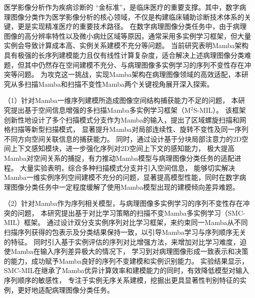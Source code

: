 \begin{cabstract}	%
医学影像分析作为疾病诊断的 “金标准”，是临床医疗的重要支撑。其中，数字病理图像分类作为医学影像分析的核心领域，不仅是构建临床辅助诊断技术体系的关键，更是实现精准医疗的重要技术路径。
在数字病理图像分类任务中，由于病理图像的高分辨率特性以及微小病灶区域等原因，通常采用多实例学习框架，但大量实例会导致计算成本高、实例关系建模不充分等问题。
当前研究表明Mamba架构具有极强的长序列建模能力且仅有线性计算复杂度，适合解决上述病理图像分类难题，但其中仍然存在空间建模不充分、与病理图像多实例学习的序列不变性存在冲突等问题。
为攻克这一挑战，实现Mamba架构在病理图像领域的高效适配，本研究从多扫描Mamba和扫描不变性Mamba两个关键视角展开深入探索。

（1）针对Mamba一维序列建模所造成图像空间结构捕获能力不足的问题，
本研究提出基于空间信息增强的多扫描Mamba多实例学习框架（M$^2$S-MIL）。
该框架创新性地设计了多个扫描模式分支作为Mamba的输入，提出了区域螺旋扫描和网格扫描等新型扫描模式，
显著提升Mamba对局部连续性、旋转不变性及同一序列不同方向空间关联信息的捕获能力。
同时，通过设计基于分块局部注意力的2D空间上下文感知模块，进一步强化序列对2D空间上下文的感知能力，
极大提高Mamba对空间关系的捕捉，有力推动Mamba模型与病理图像分类任务的适配进程。
大量实验表明，综合多种扫描模式分支并引入空间信息，
能够切实解决Mamba一维实例序列空间建模不充分的问题，显著提高模型性能，同时在数字病理图像分类任务中一定程度缓解了使用Mamba模型出现的建模倾向差异难题。​

（2）针对Mamba作为序列相关模型，与病理图像多实例学习的序列不变性存在冲突的问题，
本研究提出基于对比学习策略的扫描不变Mamba多实例学习（SMC-MIL）框架。
通过设计双分支实例序列对比学习框架，来约束同一Mamba从不同扫描序列获得的包表示及分类结果保持一致，以引导Mamba学习与序列顺序无关的特征。
同时引入基于实例评估的序列对比增强方法，来增加对比学习难度，迫使Mamba在输入序列差异极大的情况下，
学习到对病理图像形成一致表示和决策的能力，成功赋予Mamba良好的序列不变建模和实例识别能力。
实验结果显示，SMC-MIL在继承了Mamba优异计算效率和建模能力的同时，有效降低模型对输入序列顺序的敏感性，
专注于实例无序关系建模，挖掘出更具显著性判别特征的实例，更好地适配病理图像分类任务。

\end{cabstract}

